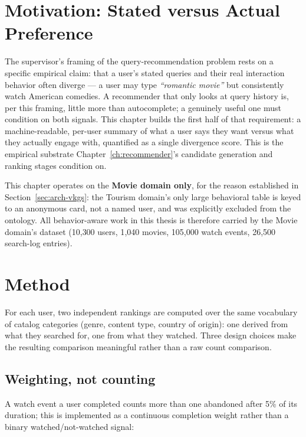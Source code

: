 \section{Motivation: Stated versus Actual Preference}
\label{sec:behavior-motivation}

The supervisor's framing of the query-recommendation problem rests on a specific empirical claim:
that a user's stated queries and their real interaction behavior often diverge --- a user may type
\emph{``romantic movie''} but consistently watch American comedies. A recommender that only looks
at query history is, per this framing, little more than autocomplete; a genuinely useful one must
condition on both signals. This chapter builds the first half of that requirement: a
machine-readable, per-user summary of what a user says they want versus what they actually engage
with, quantified as a single divergence score. This is the empirical substrate
Chapter~\ref{ch:recommender}'s candidate generation and ranking stages condition on.

This chapter operates on the \textbf{Movie domain only}, for the reason established in
Section~\ref{sec:arch-vkgs}: the Tourism domain's only large behavioral table is keyed to an
anonymous card, not a named user, and was explicitly excluded from the ontology. All
behavior-aware work in this thesis is therefore carried by the Movie domain's dataset (10{,}300
users, 1{,}040 movies, 105{,}000 watch events, 26{,}500 search-log entries).

\section{Method}
\label{sec:behavior-method}

For each user, two independent rankings are computed over the same vocabulary of catalog categories
(genre, content type, country of origin): one derived from what they searched for, one from what
they watched. Three design choices make the resulting comparison meaningful rather than a raw
count comparison.

\subsection{Weighting, not counting}

A watch event a user completed counts more than one abandoned after 5\% of its duration; this is
implemented as a continuous completion weight rather than a binary watched/not-watched signal:

